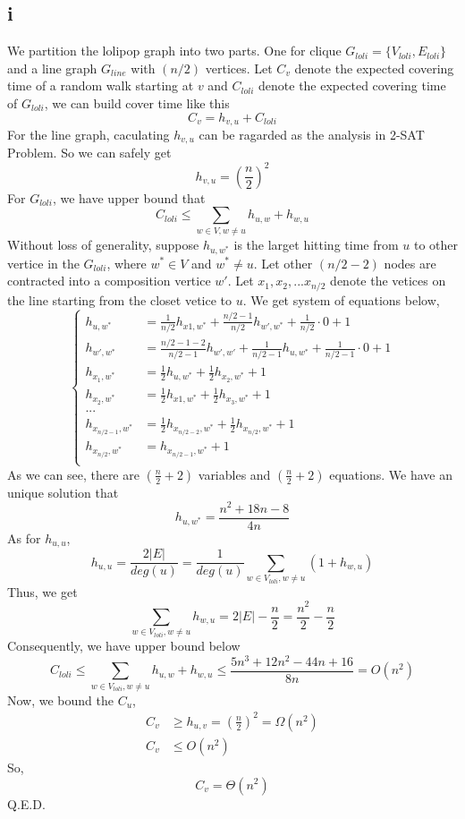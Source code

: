 \documentclass{article}
\begin{document}
	\subsection{i}
	We partition the lolipop graph into two parts. One for clique $G_{loli}=\{V_{loli}, E_{loli}\}$ and a line graph $G_{line}$ with $(n/2)$ vertices.
	Let $C_{v}$ denote the expected covering time of a random walk starting at $v$ and $C_{loli}$ denote the expected covering time of $G_{loli}$, we can build cover time like this
	$$
	C_{v} = h_{v,u} + C_{loli}
	$$
	For the line graph, caculating $h_{v,u}$ can be ragarded as the analysis in 2-SAT Problem. So we can safely get
	$$
	h_{v,u} = (\frac{n}{2})^2
	$$
	For $G_{loli}$, we have upper bound that
	$$
	C_{loli} \leq \sum_{w \in V, w \neq u}h_{u,w} + h_{w,u}
	$$
	Without loss of generality, suppose $h_{u,w^*}$ is the larget hitting time from $u$ to other vertice in the $G_{loli}$, where $w^* \in V$ and $w^* \neq u$. 
	Let other $(n/2-2)$ nodes are contracted into a composition vertice $w'$.
	Let $x_1,x_2,...x_{n/2}$ denote the vetices on the line starting from the closet vetice to $u$. 
	We get system of equations below,
	$$
	\begin{cases}
	h_{u, w^*} &= \frac{1}{n/2}h_{x1, w^*} + \frac{n/2-1}{n/2}h_{w', w^*}+\frac{1}{n/2} \cdot 0 + 1\\
	h_{w',w^*} &= \frac{n/2-1-2}{n/2-1}h_{w',w'} + \frac{1}{n/2-1}h_{u,w^*} + \frac{1}{n/2-1} \cdot 0 + 1\\
	h_{x_1, w^*} &= \frac{1}{2}h_{u,w^*}+\frac{1}{2}h_{x_2,w^*}+1\\
	h_{x_2, w^*} &= \frac{1}{2}h_{x1,w^*}+\frac{1}{2}h_{x_3,w^*}+1\\
	...\\
	h_{x_{n/2-1}, w^*} &= \frac{1}{2}h_{x_{n/2-2},w^*}+\frac{1}{2}h_{x_{n/2},w^*}+1\\
	h_{x_{n/2}, w^*} &= h_{x_{n/2-1},w^*}+1\\	
	\end{cases}
	$$
	As we can see, there are $(\frac{n}{2}+2)$ variables and $(\frac{n}{2}+2)$ equations. We have an unique solution that
	$$
	h_{u, w^*} = \frac{n^2+18n-8}{4n}
	$$
	As for $h_{u,u}$, 
	$$
	h_{u,u}=\frac{2|E|}{deg(u)}=\frac{1}{deg(u)}\sum_{w \in V_{loli}, w \neq u}(1+h_{w,u})
	$$
	Thus, we get
	$$
	\sum_{w \in V_{loli}, w \neq u} h_{w,u} = 2|E|-\frac{n}{2}=\frac{n^2}{2}-\frac{n}{2}
	$$
	Consequently, we have upper bound below
	$$
	C_{loli} \leq \sum_{w \in V_{loli}, w \neq u}h_{u,w}+h_{w,u} \leq \frac{5n^3+12n^2-44n+16}{8n} = O(n^2)
	$$
	Now, we bound the $C_u$,
	$$
	\begin{aligned}
	C_v &\geq h_{u,v} = (\frac{n}{2})^2 = \Omega(n^2)\\
	C_v &\leq O(n^2)
	\end{aligned}
	$$
	So,
	$$
	C_v = \Theta(n^2)
	$$
	Q.E.D.
\end{document}
